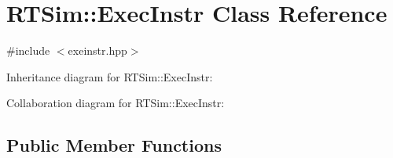 \hypertarget{classRTSim_1_1ExecInstr}{}\section{R\+T\+Sim\+:\+:Exec\+Instr Class Reference}
\label{classRTSim_1_1ExecInstr}


{\ttfamily \#include $<$exeinstr.\+hpp$>$}



Inheritance diagram for R\+T\+Sim\+:\+:Exec\+Instr\+:


Collaboration diagram for R\+T\+Sim\+:\+:Exec\+Instr\+:
\subsection*{Public Member Functions}
